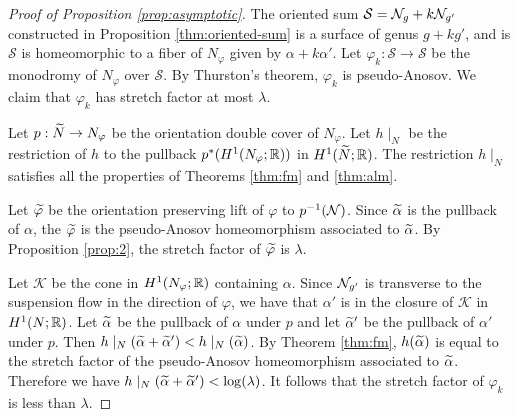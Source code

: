 \begin{proof}[Proof of Proposition \ref{prop:asymptotic}]
The oriented sum $\mathcal{S}=\mathcal{N}_g+k\mathcal{N}_{g'}$ constructed in Proposition \ref{thm:oriented-sum} is a surface of genus $g+kg'$, and is $\mathcal{S}$ is homeomorphic to a fiber of $N_\varphi$ given by $\alpha+k\alpha'$.  Let $\varphi_{k}:\mathcal{S}\rightarrow\mathcal{S}$ be the monodromy of $N_\varphi$ over $\mathcal{S}$.  By Thurston's theorem, $\varphi_k$ is pseudo-Anosov.  We claim that $\varphi_k$ has stretch factor at most $\lambda$.


Let $p:\widetilde{N}\rightarrow N_\varphi$ be the orientation double cover of $N_\varphi$. Let $h\mid_{N}$ be the restriction of $h$ to the pullback  $p^\ast(H^1(N_\varphi; \mathbb{R}))$ in $H^1(\widetilde{N}; \mathbb{R})$.
The restriction $h\mid_N$ satisfies all the properties of Theorems \ref{thm:fm} and \ref{thm:alm}.

 Let $\widetilde{\varphi}$ be the orientation preserving lift of $\varphi$ to $p^{-1}(\mathcal{N})$.  Since $\widetilde{\alpha}$ is the pullback of $\alpha$, the $\widetilde{\varphi}$ is the pseudo-Anosov homeomorphism associated to $\widetilde{\alpha}$.  By Proposition \ref{prop:2}, the stretch factor of $\widetilde{\varphi}$ is $\lambda$.

Let $\mathcal{K}$ be the cone in $H^1(N_\varphi;\mathbb{R})$ containing $\alpha$.  Since $\mathcal{N}_{g'}$ is transverse to the suspension flow in the direction of $\varphi$, we have that $\alpha'$ is in the closure of $\mathcal{K}$ in $H^1(N;\mathbb{R})$.  Let $\widetilde{\alpha}$ be the pullback of $\alpha$ under $p$ and let $\widetilde{\alpha}'$ be the pullback of $\alpha'$ under $p$.  Then $h\mid_N(\widetilde{\alpha}+\widetilde{\alpha}')<h\mid_N(\widetilde{\alpha})$.  By Theorem \ref{thm:fm}, $h(\widetilde{\alpha})$ is equal to the stretch factor of the pseudo-Anosov homeomorphism associated to $\widetilde{\alpha}$.  Therefore we have $h\mid_N(\widetilde{\alpha}+\widetilde{\alpha}')<\log(\lambda)$. It follows that the stretch factor of $\varphi_k$ is less than $\lambda$.
\end{proof}

